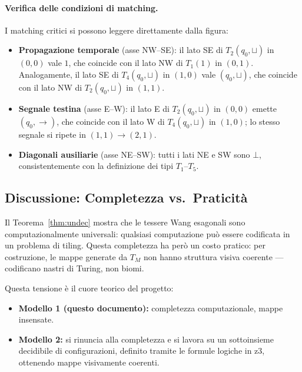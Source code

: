 \documentclass[12pt, a4paper]{article}
\newcommand{\blank}{\sqcup}
\begin{document}
\paragraph{Verifica delle condizioni di matching.}
I matching critici si possono leggere direttamente dalla figura:
\begin{itemize}
  \item \textbf{Propagazione temporale} (asse NW--SE): il lato SE di $T_2(q_0,\blank)$
    in $(0,0)$ vale $1$, che coincide con il lato NW di $T_1(1)$ in $(0,1)$.
    Analogamente, il lato SE di $T_4(q_0,\blank)$ in $(1,0)$ vale $(q_0,\blank)$,
    che coincide con il lato NW di $T_2(q_0,\blank)$ in $(1,1)$.
  \item \textbf{Segnale testina} (asse E--W): il lato E di $T_2(q_0,\blank)$ in $(0,0)$
    emette $(q_0,{\to})$, che coincide con il lato W di $T_4(q_0,\blank)$ in $(1,0)$;
    lo stesso segnale si ripete in $(1,1) \to (2,1)$.
  \item \textbf{Diagonali ausiliarie} (asse NE--SW): tutti i lati NE e SW sono $\bot$,
    consistentemente con la definizione dei tipi $T_1$--$T_5$.
\end{itemize}

\subsection{Discussione: Completezza vs.\ Praticità}

Il Teorema~\ref{thm:undec} mostra che le tessere Wang esagonali sono computazionalmente
universali: qualsiasi computazione può essere codificata in un problema di tiling.
Questa completezza ha però un costo pratico: per costruzione, le mappe generate da $T_M$
non hanno struttura visiva coerente — codificano nastri di Turing, non biomi.

Questa tensione è il cuore teorico del progetto:
\begin{itemize}
  \item \textbf{Modello 1 (questo documento):} completezza computazionale, mappe insensate.
  \item \textbf{Modello 2:} si rinuncia alla completezza e si lavora su un sottoinsieme
        decidibile di configurazioni, definito tramite le formule logiche in z3,
        ottenendo mappe visivamente coerenti.
\end{itemize}
\end{document}

